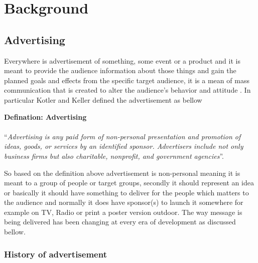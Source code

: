 
\chapter{Background} %

\label{Chapter2} %
\newpage

\section{Advertising}

Everywhere is advertisement of something, some event or a product and it is meant to provide the audience information about those things and gain the planned goals and effects from the specific target audience, it is a mean of mass communication that is created to alter the audience’s behavior and attitude \cite{advertisementdef}. In particular Kotler and Keller defined the advertisement as bellow

\begin{snugshade}
\textbf{Defination: Advertising }\\ \\ ``\emph{Advertising is any paid form of non-personal presentation and promotion of ideas, goods, or services by an identified sponsor. Advertisers include not only business firms but also charitable, nonprofit, and government agencies}''\cite{ad_def}.
\end{snugshade}

So based on the definition above advertisement is non-personal meaning it is meant to a group of people or target groups, secondly it should represent an idea or basically it should have something to deliver for the people which matters to the audience and normally it does have sponsor(s) to launch it somewhere for example on TV, Radio or print a poster version outdoor. The way message is being delivered has been changing at every era of development as discussed bellow.



\subsection{History of advertisement}

